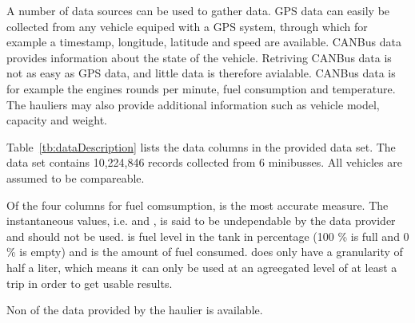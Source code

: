 A number of data sources can be used to gather data.
GPS data can easily be collected from any vehicle equiped with a GPS system, through which for example a timestamp, longitude, latitude and speed are available.
CANBus data provides information about the state of the vehicle.  %
Retriving CANBus data is not as easy as GPS data, and little data is therefore avialable. 
CANBus data is for example the engines rounds per minute, fuel consumption and temperature. 
The hauliers may also provide additional information such as vehicle model, capacity and weight. 

Table~\ref{tb:dataDescription} lists the data columns in the provided data set.
The data set contains 10,224,846 records collected from 6 minibusses. 
All vehicles are assumed to be compareable.%

Of the four columns for fuel comsumption,  is the most accurate measure.
The instantaneous values, i.e.  and , is said to be undependable by the data provider and should not be used. 
 is fuel level in the tank in percentage (100 \% is full and 0 \% is empty) and  is the amount of fuel consumed.
 does only have a granularity of half a liter, which means it can only be used at an agreegated level of at least a trip in order to get usable results.

Non of the data provided by the haulier is available.